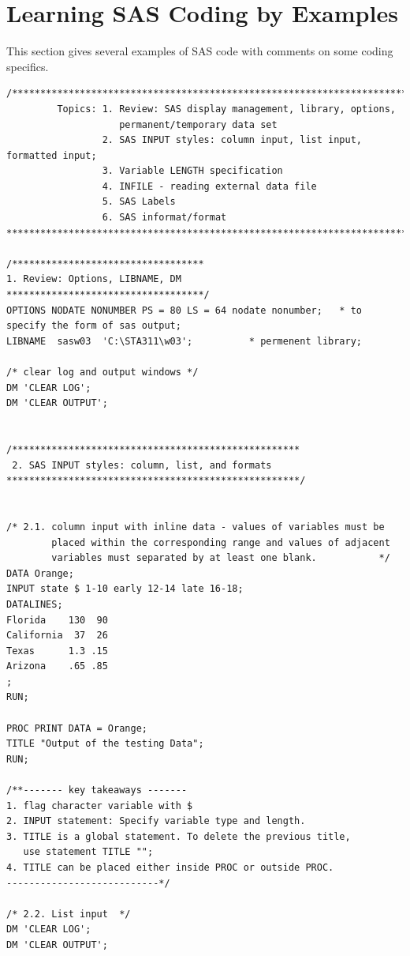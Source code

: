 \documentclass[
]{book}
\begin{document}
\hypertarget{learning-sas-coding-by-examples-1}{%
\section{Learning SAS Coding by Examples}\label{learning-sas-coding-by-examples-1}}

This section gives several examples of SAS code with comments on some coding specifics.

\begin{verbatim}
/*******************************************************************************
         Topics: 1. Review: SAS display management, library, options, 
                    permanent/temporary data set 
                 2. SAS INPUT styles: column input, list input, formatted input;
                 3. Variable LENGTH specification
                 4. INFILE - reading external data file
                 5. SAS Labels
                 6. SAS informat/format
*******************************************************************************/

/**********************************
1. Review: Options, LIBNAME, DM
***********************************/
OPTIONS NODATE NONUMBER PS = 80 LS = 64 nodate nonumber;   * to specify the form of sas output;
LIBNAME  sasw03  'C:\STA311\w03';          * permenent library;

/* clear log and output windows */
DM 'CLEAR LOG';
DM 'CLEAR OUTPUT';


/***************************************************
 2. SAS INPUT styles: column, list, and formats
****************************************************/


/* 2.1. column input with inline data - values of variables must be 
        placed within the corresponding range and values of adjacent
        variables must separated by at least one blank.           */
DATA Orange;
INPUT state $ 1-10 early 12-14 late 16-18;   
DATALINES;
Florida    130  90
California  37  26
Texas      1.3 .15
Arizona    .65 .85
;
RUN;

PROC PRINT DATA = Orange;
TITLE "Output of the testing Data";
RUN;

/**------- key takeaways -------
1. flag character variable with $
2. INPUT statement: Specify variable type and length.
3. TITLE is a global statement. To delete the previous title, 
   use statement TITLE ""; 
4. TITLE can be placed either inside PROC or outside PROC.
---------------------------*/

/* 2.2. List input  */
DM 'CLEAR LOG';
DM 'CLEAR OUTPUT';


\end{verbatim}
\end{document}
